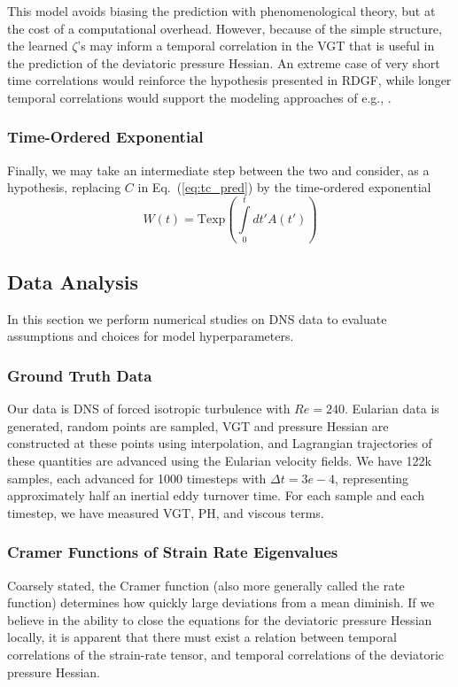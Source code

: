 This model avoids biasing the prediction with phenomenological theory, but at the cost of a computational overhead. However, because of the simple structure, the learned $\zeta$'s may inform a temporal correlation in the VGT that is useful in the prediction of the deviatoric pressure Hessian. An extreme case of very short time correlations would reinforce the hypothesis presented in RDGF, while longer temporal correlations would support the modeling approaches of e.g., \cite{tian2021_MZ}.

\subsubsection{Time-Ordered Exponential}
Finally, we may take an intermediate step between the two and consider, as a hypothesis, replacing $C$ in Eq.~(\ref{eq:tc_pred}) by the time-ordered exponential 
\begin{equation}
    W(t) = \text{Texp}\left(\int\limits_0^t dt' A(t')\right)
\end{equation}

\subsection{Data Analysis}
In this section we perform numerical studies on DNS data to evaluate assumptions and choices for model hyperparameters. 

\subsubsection{Ground Truth Data}
Our data is DNS of forced isotropic turbulence with $Re = 240$. Eularian data is generated, random points are sampled, VGT and pressure Hessian are constructed at these points using interpolation, and Lagrangian trajectories of these quantities are advanced using the Eularian velocity fields. We have 122k samples, each advanced for 1000 timesteps with $\Delta t = 3e-4$, representing approximately half an inertial eddy turnover time. For each sample and each timestep, we have measured VGT, PH, and viscous terms.

\subsubsection{Cramer Functions of Strain Rate Eigenvalues}
Coarsely stated, the Cramer function (also more generally called the rate function) determines how quickly large deviations from a mean diminish. If we believe in the ability to close the equations for the deviatoric pressure Hessian locally, it is apparent that there must exist a relation between temporal correlations of the strain-rate tensor, and temporal correlations of the deviatoric pressure Hessian.

